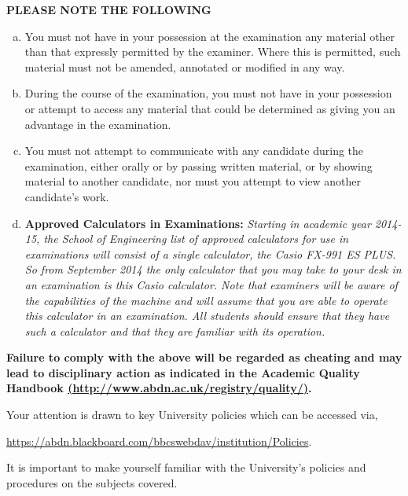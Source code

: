 \documentclass[12pts,a4paper,amsmath,amssymb,floatfix]{article}%
\begin{document}
\medskip

{\large {\bf PLEASE NOTE THE FOLLOWING}}
\begin{enumerate}[(a)]
\item You must not have in your possession at the examination any material other than that expressly permitted by the examiner. Where this is permitted, such material must not be amended, annotated or modified in any way.
\item During the course of the examination, you must not have in your possession or attempt to access any material that could be determined as giving you an advantage in the examination.
\item You must not attempt to communicate with any candidate during the examination, either orally or by passing written material, or by showing material to another candidate, nor must you attempt to view another candidate's work.
\item {\bf Approved Calculators in Examinations:}  {\it Starting in academic year 2014-15, the School of Engineering list of approved calculators for use in examinations will consist of a single calculator, the Casio FX-991 ES PLUS.  So from September 2014 the only calculator that you may take to your desk in an examination is this Casio calculator.  Note that examiners will be aware of the capabilities of the machine and will assume that you are able to operate this calculator in an examination.  All students should ensure that they have such a calculator and that they are familiar with its operation.}
\end{enumerate}

\bigskip

{\bf Failure to comply with the above will be regarded as cheating and may lead to disciplinary action as indicated in the Academic Quality Handbook \href{http://www.abdn.ac.uk/registry/quality/}{(http://www.abdn.ac.uk/registry/quality/)}. 

\medskip

Your attention is drawn to key University policies which can be accessed via,
\begin{center}
\href{https://abdn.blackboard.com/bbcswebdav/institution/Policies}{https://abdn.blackboard.com/bbcswebdav/institution/Policies}.
\end{center}
It is important to make yourself familiar with the University's policies and procedures on the subjects covered.}


\end{document}
